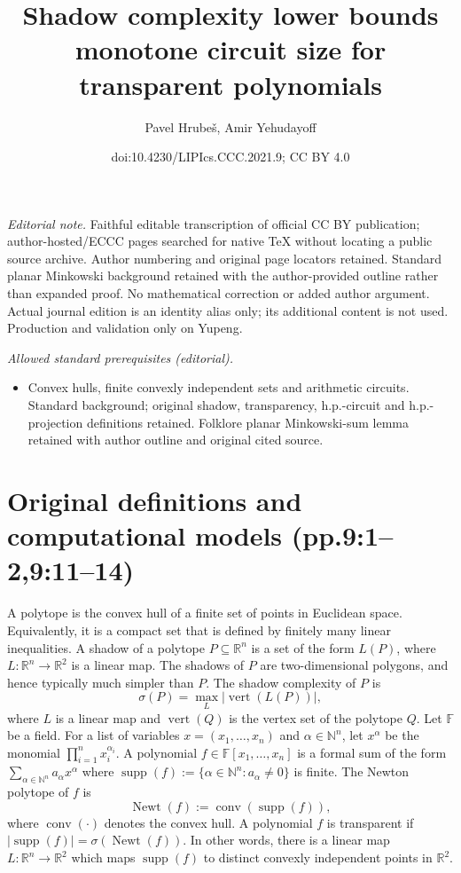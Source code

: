 \documentclass[10pt,a4paper]{article}
\title{Shadow complexity lower bounds monotone circuit size for transparent polynomials}
\author{Pavel Hrubeš, Amir Yehudayoff}
\date{doi:10.4230/LIPIcs.CCC.2021.9; CC BY 4.0}
\newcommand{\supp}{\operatorname{supp}}
\newcommand{\Newt}{\operatorname{Newt}}
\newcommand{\conv}{\operatorname{conv}}
\newcommand{\vertset}{\operatorname{vert}}
\begin{document}
\maketitle
\noindent\textit{Editorial note.} Faithful editable transcription of official CC BY publication; author-hosted/ECCC pages searched for native TeX without locating a public source archive. Author numbering and original page locators retained. Standard planar Minkowski background retained with the author-provided outline rather than expanded proof. No mathematical correction or added author argument. Actual journal edition is an identity alias only; its additional content is not used. Production and validation only on Yupeng.\par\medskip
\noindent\textit{Allowed standard prerequisites (editorial).}\begin{itemize}
\item Convex hulls, finite convexly independent sets and arithmetic circuits. Standard background; original shadow, transparency, h.p.-circuit and h.p.-projection definitions retained. Folklore planar Minkowski-sum lemma retained with author outline and original cited source.
\end{itemize}\medskip
\section*{Original definitions and computational models (pp.9:1--2,9:11--14)}
A polytope is the convex hull of a finite set of points in Euclidean space. Equivalently, it is a compact set that is defined by finitely many linear inequalities.
A shadow of a polytope $P\subseteq\mathbb R^n$ is a set of the form $L(P)$, where $L:\mathbb R^n\to\mathbb R^2$ is a linear map. The shadows of $P$ are two-dimensional polygons, and hence typically much simpler than $P$. The shadow complexity of $P$ is
\[
\sigma(P)=\max_L |\vertset(L(P))|,
\]
where $L$ is a linear map and $\vertset(Q)$ is the vertex set of the polytope $Q$.
Let $\mathbb F$ be a field. For a list of variables $x=(x_1,\ldots,x_n)$ and $\alpha\in\mathbb N^n$, let $x^\alpha$ be the monomial $\prod_{i=1}^n x_i^{\alpha_i}$. A polynomial $f\in\mathbb F[x_1,\ldots,x_n]$ is a formal sum of the form $\sum_{\alpha\in\mathbb N^n}a_\alpha x^\alpha$ where $\supp(f):=\{\alpha\in\mathbb N^n:a_\alpha\ne0\}$ is finite. The Newton polytope of $f$ is
\[\Newt(f):=\conv(\supp(f)),\]
where $\conv(\cdot)$ denotes the convex hull.
A polynomial $f$ is transparent if $|\supp(f)|=\sigma(\Newt(f))$. In other words, there is a linear map $L:\mathbb R^n\to\mathbb R^2$ which maps $\supp(f)$ to distinct convexly independent points in $\mathbb R^2$.
\end{document}
